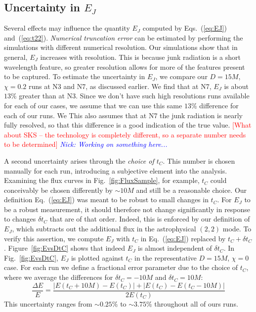 \documentclass[aps,prd,amsmath,floatfix,twocolumn,superscriptaddress,nofootinbib,showpacs]{revtex4-1}
\theoremstyle{plain}
\theoremstyle{definition}
\newcommand{\red}[1]{\textcolor{Red}{#1}}
\newcommand{\nick}[1]{\textcolor{blue}{\textit{Nick: #1}}}
\begin{document}
\subsection{Uncertainty in $E_J$}
\label{subsec:ErrorEstimation}


Several effects may influence the quantity $E_J$ computed by
  Eqs.~(\ref{eq:EJ}) and~(\ref{eq:t22}).  {\em Numerical truncation
    error} can be estimated by performing the simulations with
  different numerical resolution.  Our simulations show that in general,
  $E_J$ increases with resolution. This is because junk radiation is
a short wavelength feature, so greater resolution allows for more of
the features present to be captured.  To estimate the
uncertainty in $E_J$, we compare our $D=15M$,
$\chi=0.2$ runs at N3 and N7, as discussed earlier. We find that
at N7, $E_J$ is about $13\%$ greater than at N3. Since we don't
have such high resolutions runs available for each of our cases, we
assume that we can use this same $13\%$ difference for each of our
runs. We This also assumes that at N7 the junk
radiation is nearly fully resolved, so that this difference is a good
indication of the true value.  \red{[What about SKS -- the technology
  is completely different, so a separate number needs to be
  determined]} \nick{Working on something here...}


A second uncertainty arises through the {\em choice of $t_C$}.
This number is chosen manually for
each run, introducing a
  subjective element into the analysis. Examining the flux curves in
Fig.~\ref{fig:FluxSample}, for example, $t_C$ could conceivably be
chosen differently by $\sim 10 M$ and still be a
reasonable choice. {Our definition Eq.~(\ref{eq:EJ}) was meant
to be robust to small changes in $t_C$.  For $E_J$ to be a robust measurement, it should
therefore not change significantly in response to changes $\delta t_C$
that are of that order. Indeed, this is enforced by our definition of
$E_J$, which subtracts out the additional flux in the astrophysical
$(2,2)$ mode.}  To verify this assertion, we compute $E_J$ with $t_C$ in Eq.~(\ref{eq:EJ}) replaced by $t_C+\delta t_C$.  Figure~\ref{fig:EvsDtC} shows that indeed $E_J$ is almost independent of $\delta t_C$.  
In Fig.~\ref{fig:EvsDtC}, $E_J$ is plotted against $t_C$
in the representative $D=15M$, $\chi=0$ case.
For each run we define a fractional
error parameter due to the choice of $t_C$, where we average the
differences for $\delta t_C = -10M$ and $\delta t_C = 10M$:
\begin{equation}
\frac{\Delta E}{E} = \frac{|E(t_C+10M) - E(t_C)| + |E(t_C) - E(t_C -
  10M)|}{2E(t_C)}
\end{equation}
This uncertainty ranges from $\sim 0.25\%$ to $\sim 3.75\%$ throughout
all of ours runs.
\end{document}
